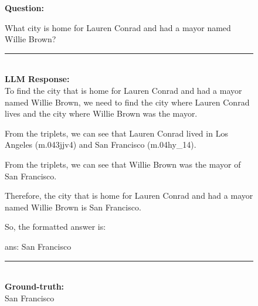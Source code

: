 \begin{figure}
\begin{tcolorbox}[colback=gray!5!white, colframe=gray!75!black, title=CWQ-WebQTrn-2904\_cb8d941f825c5dd7b2d6f3faef7f9229]
\scriptsize

\textbf{Question:}\\
\raggedright What city is home for Lauren Conrad and had a mayor named Willie Brown?

\rule{\linewidth}{0.4pt}
\\
\textbf{LLM Response:}\\
To find the city that is home for Lauren Conrad and had a mayor named Willie Brown, we need to find the city where Lauren Conrad lives and the city where Willie Brown was the mayor.



From the triplets, we can see that Lauren Conrad lived in Los Angeles (m.043jjv4) and San Francisco (m.04hy\_14).



From the triplets, we can see that Willie Brown was the mayor of San Francisco.



Therefore, the city that is home for Lauren Conrad and had a mayor named Willie Brown is San Francisco.



So, the formatted answer is:



ans: San Francisco

\rule{\linewidth}{0.4pt}
\\
\textbf{Ground-truth:}\\
San Francisco

\end{tcolorbox}
 

\end{figure}







